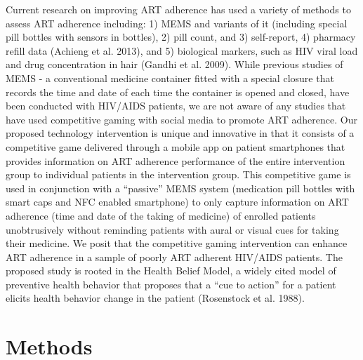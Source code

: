 Current research on improving ART adherence has used a variety of methods to assess ART adherence including: 1) MEMS and variants of it (including special pill bottles with sensors in bottles), 2) pill count, and 3) self-report, 4) pharmacy refill data (Achieng et al. 2013), and 5) biological markers, such as HIV viral load and drug concentration in hair (Gandhi et al. 2009). While previous studies of MEMS - a conventional medicine container fitted with a special closure that records the time and date of each time the container is opened and closed, have been conducted with HIV/AIDS patients, we are not aware of any studies that have used competitive gaming with social media to promote ART adherence. Our proposed technology intervention is unique and innovative in that it consists of a competitive game delivered through a mobile app on patient smartphones that provides information on ART adherence performance of the entire intervention group to individual patients in the intervention group. This competitive game is used in conjunction with a “passive” MEMS system (medication pill bottles with smart caps and NFC enabled smartphone) to only capture information on ART adherence (time and date of the taking of medicine) of enrolled patients unobtrusively without reminding patients with aural or visual cues for taking their medicine. We posit that the competitive gaming intervention can enhance ART adherence in a sample of poorly ART adherent HIV/AIDS patients. The proposed study is rooted in the Health Belief Model, a widely cited model of preventive health behavior that proposes that a “cue to action” for a patient elicits health behavior change in the patient (Rosenstock et al. 1988).

\section{Methods}

